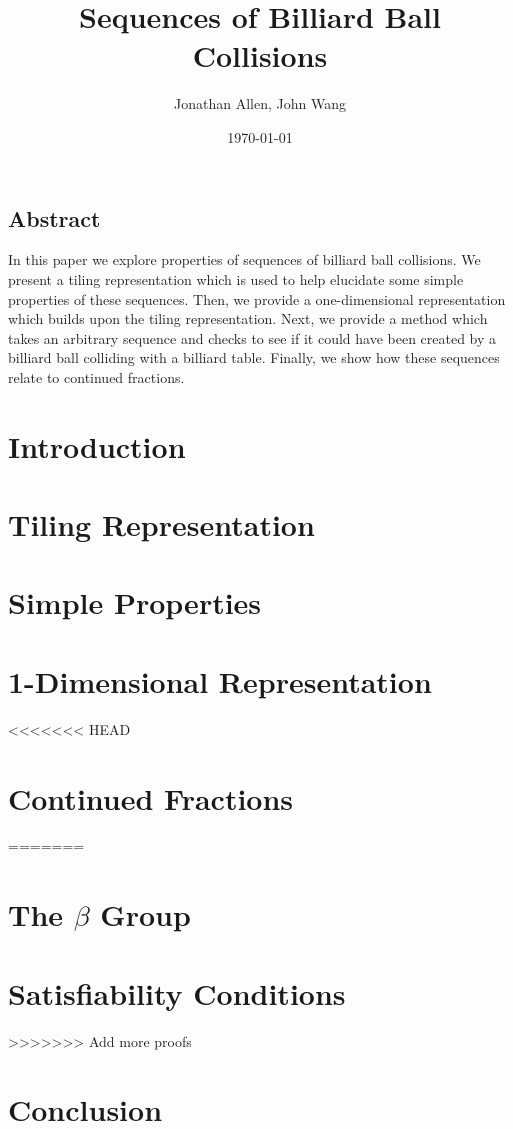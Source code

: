 \documentclass[12pt]{amsart}   %
\begin{document}
\graphicspath{ {figures/} }

\title[Billiards]{Sequences of Billiard Ball Collisions}

\author{Jonathan Allen, John Wang}
\date{\today}

\maketitle

\subsection*{Abstract}

In this paper we explore properties of sequences of billiard ball collisions. We present a tiling representation which is used to help elucidate some simple properties of these sequences. Then, we provide a one-dimensional representation which builds upon the tiling representation. Next, we provide a method which takes an arbitrary sequence and checks to see if it could have been created by a billiard ball colliding with a billiard table. Finally, we show how these sequences relate to continued fractions.

\section{Introduction}


\section{Tiling Representation}


\section{Simple Properties}


\section{1-Dimensional Representation}


<<<<<<< HEAD
\section{Continued Fractions}

=======
\section{The $\beta$ Group}


\section{Satisfiability Conditions}

>>>>>>> Add more proofs

\section{Conclusion}


\begin{appendix}
\end{appendix}
\end{document}
